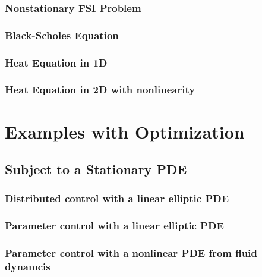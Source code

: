 \documentclass[a4paper,cleardoubleempty]{scrreprt}
\begin{document}
\subsection{Nonstationary FSI Problem}
\label{PDE_Instat_FSI}

\clearpage
\subsection{Black-Scholes Equation}
\label{PDE_Instat_Black_Scholes}

\clearpage
\subsection{Heat Equation in 1D}
\label{PDE_Instat_Heat_1D}

\clearpage
\subsection{Heat Equation in 2D with nonlinearity}
\label{PDE_Instat_Heat_2D}

\cleardoublepage
\chapter{Examples with Optimization}
\label{OPT}
\section{Subject to a Stationary PDE}
\label{OPT_Stat}
\subsection{Distributed control with a linear elliptic PDE}
\label{OPT_Stat_Distrib_Lin_Ellipt}

\clearpage
\subsection{Parameter control with a linear elliptic PDE}
\label{OPT_Stat_Param_Lin_Ellipt}

\clearpage
\subsection{Parameter control with a nonlinear PDE from fluid dynamcis}
\label{OPT_Stat_Param_Nonlin_Fluid}

\clearpage
\end{document}
